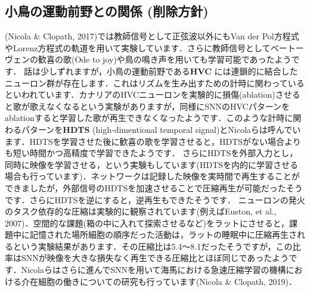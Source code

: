 \subsection{小鳥の運動前野との関係 (削除方針)}
(Nicola \& Clopath, 2017)では教師信号として正弦波以外にもVan der Pol方程式やLorenz方程式の軌道を用いて実験しています．さらに教師信号としてベートーヴェンの歓喜の歌(Ode to joy)や鳥の鳴き声を用いても学習可能であったようです．
話は少しずれますが，小鳥の運動前野である\textbf{HVC} には連鎖的に結合したニューロン群が存在します．これはリズムを生み出すための計時に関わっているといわれています．カナリアのHVCニューロンを実験的に損傷(ablation)させると歌が歌えなくなるという実験がありますが，同様にSNNのHVCパターンをablationすると学習した歌が再生できなくなったようです．このような計時に関わるパターンを\textbf{HDTS} (high-dimentional temporal signal)とNicolaらは呼んでいます．HDTSを学習させた後に歓喜の歌を学習させると，HDTSがない場合よりも短い時間かつ高精度で学習できたようです．
さらにHDTSを外部入力とし，同時に映像を学習させる，という実験もしています(HDTSを内的に学習させる場合も行っています)．ネットワークは記録した映像を実時間で再生することができましたが，外部信号のHDTSを加速させることで圧縮再生が可能だったそうです．さらにHDTSを逆にすると，逆再生もできたそうです．
ニューロンの発火のタスク依存的な圧縮は実験的に観察されています(例えばEuston, et al., 2007)．空間的な課題(箱の中に入れて探索させるなど)をラットにさせると，課題中に記憶された場所細胞の順序だった活動は，ラットの睡眠中に圧縮再生されるという実験結果があります．その圧縮比は5.4〜8.1だったそうですが，この比率はSNNが映像を大きな損失なく再生できる圧縮比とほぼ同じであったようです．Nicolaらはさらに進んでSNNを用いて海馬における急速圧縮学習の機構における介在細胞の働きについての研究も行っています(Nicola \& Clopath, 2019)．
